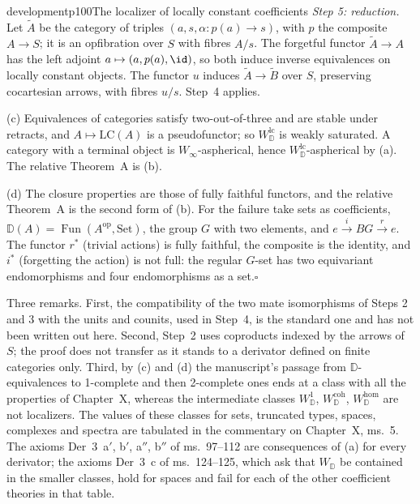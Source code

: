 \begin{dcomment}{development}{p100}{The localizer of locally constant coefficients}
\emph{Step 5: reduction.} Let $\widetilde A$ be the category of triples $(a,s,\alpha:p(a)\to s)$, with $p$ the composite $A\to S$; it is an opfibration over $S$ with fibres $A/s$. The forgetful functor $\widetilde A\to A$ has the left adjoint $a\mapsto(a,p(a),\id)$, so both induce inverse equivalences on locally constant objects. The functor $u$ induces $\widetilde A\to\widetilde B$ over $S$, preserving cocartesian arrows, with fibres $u/s$. Step~4 applies.

(c) Equivalences of categories satisfy two-out-of-three and are stable under retracts, and $A\mapsto\mathrm{LC}(A)$ is a pseudofunctor; so $W^{\mathrm{lc}}_{\mathbb D}$ is weakly saturated. A category with a terminal object is $W_\infty$-aspherical, hence $W^{\mathrm{lc}}_{\mathbb D}$-aspherical by (a). The relative Theorem~A is (b).

(d) The closure properties are those of fully faithful functors, and the relative Theorem~A is the second form of (b). For the failure take sets as coefficients, $\mathbb D(A)=\operatorname{Fun}(A^{\mathrm{op}},\mathrm{Set})$, the group $G$ with two elements, and $e\xrightarrow{i}BG\xrightarrow{r}e$. The functor $r^*$ (trivial actions) is fully faithful, the composite is the identity, and $i^*$ (forgetting the action) is not full: the regular $G$-set has two equivariant endomorphisms and four endomorphisms as a set.\hfill$\square$

Three remarks. First, the compatibility of the two mate isomorphisms of Steps 2 and 3 with the units and counits, used in Step~4, is the standard one and has not been written out here. Second, Step~2 uses coproducts indexed by the arrows of $S$; the proof does not transfer as it stands to a derivator defined on finite categories only. Third, by (c) and (d) the manuscript's passage from $\mathbb D$-equivalences to 1-complete and then 2-complete ones ends at a class with all the properties of Chapter~X, whereas the intermediate classes $W^1_{\mathbb D}$, $W^{\mathrm{coh}}_{\mathbb D}$, $W^{\mathrm{hom}}_{\mathbb D}$ are not localizers. The values of these classes for sets, truncated types, spaces, complexes and spectra are tabulated in the commentary on Chapter~X, ms.~5. The axioms Der~3~a$'$, b$'$, a$''$, b$''$ of ms.~97--112 are consequences of (a) for every derivator; the axioms Der~3~c of ms.~124--125, which ask that $W_{\mathbb D}$ be contained in the smaller classes, hold for spaces and fail for each of the other coefficient theories in that table.
\end{dcomment}

